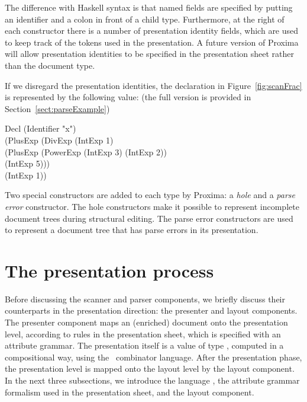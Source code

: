 \documentclass[12pt]{article}
\begin{document}
The difference with Haskell syntax is that named fields are specified by putting an identifier and a colon in front of a child type. Furthermore, at the right of each constructor there is a number of presentation identity fields, which are used to keep track of the tokens used in the presentation. A future version of Proxima will allow presentation identities to be specified in the presentation sheet rather than the document type.

If we disregard the presentation identities, the declaration in Figure~\ref{fig:scanFrac} is represented by the following value: (the full version is provided in Section~\ref{sect:parseExample})

\begin{footnotesize}
\begin{tabbedCode}
Decl (Identifier "x")\\ 
     (PlusExp (DivExp (IntExp 1) \\
                      (PlusExp (PowerExp (IntExp 3) (IntExp 2))\\
                               (IntExp 5)))\\
              (IntExp 1))\\
\end{tabbedCode}
\end{footnotesize}


Two special constructors are added to each type by Proxima: a {\em hole} and a {\em parse error} constructor. The hole constructors make it possible to represent incomplete document trees during structural editing. The parse error constructors are used to represent a document tree that has parse errors in its presentation.





%
\section{The presentation process}\label{sect:presentationProcess}
%

Before discussing the scanner and parser components, we briefly discuss their counterparts in the presentation direction: the presenter and layout components. The presenter component maps an (enriched) document onto the presentation level, according to rules in the presentation sheet, which is specified with an attribute grammar. The presentation itself is a value of type , computed in a compositional way, using the\  combinator language. After the presentation phase, the presentation level is mapped onto the layout level by the layout component. In the next three subsections, we introduce the language \Xprez, the attribute grammar formalism used in the presentation sheet, and the layout component.
\end{document}
